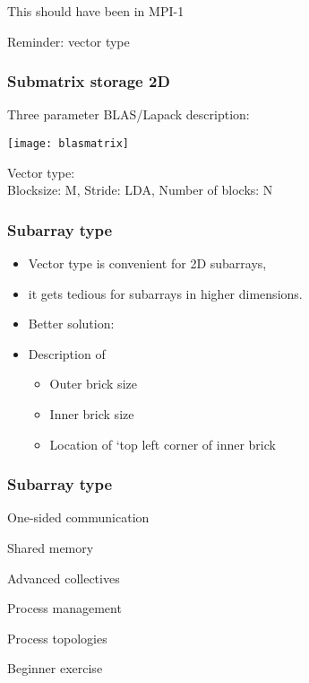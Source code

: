 \documentclass[11pt,headernav]{beamer}
\begin{document}
 {This should have been in MPI-1}


\begin{frame}[containsverbatim]{Reminder: vector type}
\end{frame}

\begin{frame}[containsverbatim]\frametitle{Submatrix storage 2D}
  Three parameter BLAS/Lapack description:

  \texttt{[image: blasmatrix]}  

  Vector type:\\
  Blocksize: M,  Stride: LDA, Number of blocks: N
\end{frame}

\begin{frame}[containsverbatim]\frametitle{Subarray type}
  \begin{itemize}
  \item Vector type is convenient for 2D subarrays,
  \item it gets tedious for subarrays in higher dimensions.
  \item Better solution: 
  \item Description of
    \begin{itemize}
    \item Outer brick size
    \item Inner brick size
    \item Location of `top left corner of inner brick
    \end{itemize}
  \end{itemize}
\end{frame}

\begin{frame}[containsverbatim]\frametitle{Subarray type}
\end{frame}

\begin{exerciseframe}[cubegather]
  
\end{exerciseframe}

 {One-sided communication}
 

 {Shared memory}


 {Advanced collectives}


 {Process management}


 {Process topologies}


 {Beginner exercise}

\begin{exerciseframe}
  
\end{exerciseframe}
\end{document}
